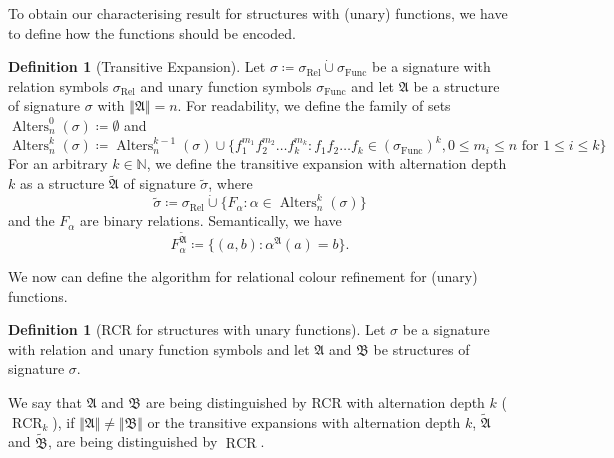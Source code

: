 \documentclass[a4paper,11pt,DIV=15]{scrartcl} %
\theoremstyle{plain}
\theoremstyle{definition}
\newtheorem{definition}[theorem]{Definition}
\newcommand{\RCR}{\operatorname{RCR}}
\begin{document}
To obtain our characterising result for structures with (unary) functions, we have to define how the functions should be encoded.

\begin{definition}[Transitive Expansion]
	Let $\sigma\coloneqq \sigma_{\operatorname{Rel}} \operatorname{\dot{\cup}} \sigma_{\operatorname{Func}}$ be a signature with relation symbols $\sigma_{\operatorname{Rel}}$ and unary function symbols $\sigma_{\operatorname{Func}}$ and let $\mathfrak A$ be a structure of signature $\sigma$ with $\Vert \mathfrak A \Vert=n$.
	For readability, we define the family of sets $\operatorname{Alters}_n^0(\sigma)\coloneqq\emptyset$ and
	$$\operatorname{Alters}^k_{n}(\sigma)\coloneqq \operatorname{Alters}^{k-1}_{n}(\sigma)\cup\{f_1^{m_1}f_2^{m_2}\dots f_k^{m_k} : f_1f_2\dots f_k\in (\sigma_{\operatorname{Func}})^k, 0 \leq m_i \leq n \text{ for } 1 \leq i \leq k\}$$
	For an arbitrary $k\in \mathbb{N}$, we define the transitive expansion with alternation depth $k$ as a structure $\widetilde{\mathfrak A}$ of signature $\widetilde{\sigma}$, where 
	$$\widetilde{\sigma}\coloneqq \sigma_{\operatorname{Rel}} \operatorname{\dot{\cup}} \{F_\alpha : \alpha \in \operatorname{Alters}_n^k(\sigma)\}$$
	and the $F_\alpha$ are binary relations.
	Semantically, we have 
	$$F_\alpha^{\widetilde{\mathfrak A}}\coloneqq \{(a, b) : \alpha^{\mathfrak A}(a)=b\}.$$
\end{definition}

We now can define the algorithm for relational colour refinement for (unary) functions.

\begin{definition}[RCR for structures with unary functions]
	Let $\sigma$ be a signature with relation and unary function symbols and let $\mathfrak A$ and $\mathfrak B$ be structures of signature $\sigma$.
	
	We say that $\mathfrak A$ and $\mathfrak B$ are being distinguished by RCR with alternation depth $k$ ($\RCR_k$), if $\Vert\mathfrak A\Vert\neq \Vert \mathfrak B\Vert$ or the transitive expansions with alternation depth $k$, $\widetilde{\mathfrak A}$ and $\widetilde{\mathfrak B}$, are being distinguished by $\RCR$.
\end{definition}
\end{document}
